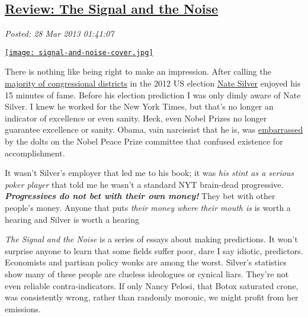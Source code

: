 %

\subsection*{\href{https://bakerjd99.wordpress.com/2013/03/27/review-the-signal-and-the-noise/}{Review: The Signal and the Noise}}


\noindent\emph{Posted: 28 Mar 2013 01:41:07}
\vspace{6pt}


\captionsetup[floatingfigure]{labelformat=empty}
\begin{floatingfigure}[l]{0.24\textwidth}
\centering
\href{http://bakerjd99.files.wordpress.com/2013/03/signal-and-noise-cover.jpg}{\texttt{[image: signal-and-noise-cover.jpg]}}
\label{fig:3901X0}
\end{floatingfigure} There
is nothing like being right to make an impression. After calling the
\href{http://www.huffingtonpost.com/2012/11/07/nate-silver-obama-reelection\_n\_2086556.html}{majority
of congressional districts} in the 2012 US election
\href{http://fivethirtyeight.blogs.nytimes.com/}{Nate Silver} enjoyed
his 15 minutes of fame. Before his election prediction I was only dimly
aware of Nate Silver. I knew he worked for the New York Times, but
that's no longer an indicator of excellence or even sanity. Heck, even
Nobel Prizes no longer guarantee excellence or sanity. Obama, vain
narcissist that he is, was
\href{http://online.wsj.com/article/SB10001424052748703746604574463171820234630.html}{embarrassed}
by the dolts on the Nobel Peace Prize committee that confused existence
for accomplishment.

It wasn't Silver's employer that led me to his book; it was \emph{his
stint as a serious poker player} that told me he wasn't a standard NYT
brain-dead progressive. \textbf{\emph{Progressives do not bet with their
own money!}} They bet with other people's money. Anyone that puts
\emph{their money where their mouth is} is worth a hearing and Silver is
worth a hearing

\emph{The Signal and the Noise} is a series of essays about making
predictions. It won't surprise anyone to learn that some fields suffer
poor, dare I say idiotic, predictors. Economists and partisan policy
wonks are among the worst. Silver's statistics show many of these people
are clueless ideologues or cynical liars. They're not even reliable
contra-indicators. If only Nancy Pelosi, that Botox saturated crone, was
consistently wrong, rather than randomly moronic, we might profit from
her emissions.

